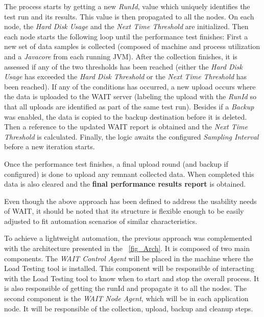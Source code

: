 \documentclass[runningheads,a4paper]{llncs}
\begin{document}
The process starts by getting a new \emph{RunId}, value which uniquely
identifies the test run and its results. This value is then propagated to all
the nodes. On each node, the \emph{Hard Disk Usage} and  the \emph{Next Time
Threshold} are initialized. Then each node starts the following
loop until the performance test finishes: First a new set of data samples is
collected (composed of machine and process utilization and a \emph{Javacore}
from each running JVM). After the collection finishes, it is assessed if any of
the two thresholds has been reached (either the \emph{Hard Disk Usage} has
exceeded the \emph{Hard Disk Threshold} or the \emph{Next Time Threshold} has
been reached). If any of the conditions has occurred, a new upload occurs where
the data is uploaded to the WAIT server (labeling the upload with the
\emph{RunId} so that all uploads are identified as part of the same test run).
Besides if a \emph{Backup} was enabled, the data is copied to the backup
destination before it is deleted. Then a reference to the updated WAIT report
is obtained and the \emph{Next Time Threshold} is calculated. Finally, the logic
awaits the configured \emph{Sampling Interval} before a new iteration starts.

Once the performance test finishes, a final upload round (and backup if
configured) is done to upload any remnant collected data. When completed this
data is also cleared and the \textbf{final performance results report} is
obtained.

Even though the above approach has been defined to address the usability needs
of WAIT, it should be noted that its structure is flexible enough to be easily
adjusted to fit automation scenarios of similar characteristics.

To achieve a lightweight automation, the previous approach was complemented with
the architecture presented in the \figurename ~\ref{fig_Arch}. It is composed of
two main components. The \emph{WAIT Control Agent} will be placed in the machine
where the Load Testing tool is installed. This component will be responsible of
interacting with the Load Testing tool to know when to start and stop the
overall process. It is also responsible of getting the runId and propagate it to
all the nodes. The second component is the \emph{WAIT Node Agent}, which will be
in each application node. It will be responsible of the collection, upload,
backup and cleanup steps.
\end{document}
